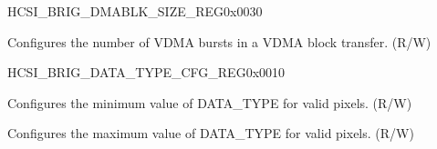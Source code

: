 \begin{register}{H}{CSI\_BRIG\_DMABLK\_SIZE\_REG}{0x0030}\label{regdesc:CSIBRIGDMABLKSIZEREG}
%
%
\regnewline%
\begin{regdesc}\begin{reglist}
\label{fielddesc:CSIBRIGDMABLKSIZE}\item [CSI\_BRIG\_DMABLK\_SIZE] Configures the number of VDMA bursts in a VDMA block transfer. (R/W)
\end{reglist}\end{regdesc}
\end{register}


\begin{register}{H}{CSI\_BRIG\_DATA\_TYPE\_CFG\_REG}{0x0010}\label{regdesc:CSIBRIGDATATYPECFGREG}
%
%
%
%
\regnewline%
\begin{regdesc}\begin{reglist}
\label{fielddesc:CSIBRIGDATATYPEMIN}\item [CSI\_BRIG\_DATA\_TYPE\_MIN] Configures the minimum value of DATA\_TYPE for valid pixels. (R/W)
\label{fielddesc:CSIBRIGDATATYPEMAX}\item [CSI\_BRIG\_DATA\_TYPE\_MAX] Configures the maximum value of DATA\_TYPE for valid pixels. (R/W)
\end{reglist}\end{regdesc}
\end{register}


